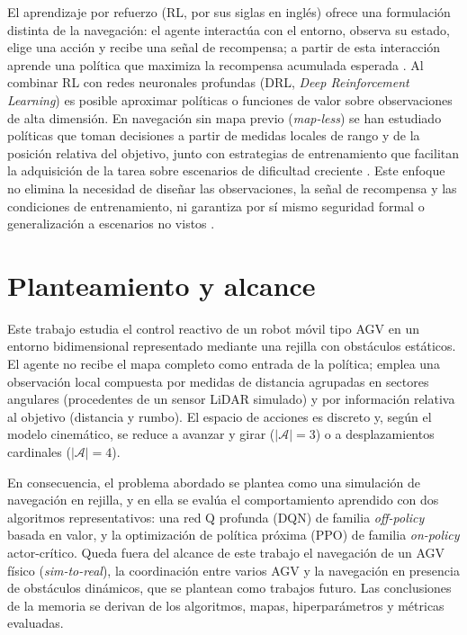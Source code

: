 El aprendizaje por refuerzo (RL, por sus siglas en inglés) ofrece una
formulación distinta de la navegación: el agente interactúa con el entorno,
observa su estado, elige una acción y recibe una señal de recompensa; a
partir de esta interacción aprende una política que maximiza la recompensa
acumulada esperada \citep{shakya2023reinforcement,murphy2025reinforcement}.
Al combinar RL con redes neuronales profundas (DRL, \textit{Deep
Reinforcement Learning}) es posible aproximar políticas o funciones de valor
sobre observaciones de alta dimensión. En navegación sin mapa previo
(\textit{map-less}) se han estudiado políticas que toman decisiones a partir
de medidas locales de rango y de la posición relativa del objetivo,
junto con estrategias de entrenamiento que facilitan la adquisición de la
tarea sobre escenarios de dificultad creciente \citep{sivashangaran2023deep,xue2022using,guo2025map}.
Este enfoque no elimina la necesidad de diseñar las observaciones, la señal
de recompensa y las condiciones de entrenamiento, ni garantiza por sí mismo
seguridad formal o generalización a escenarios no vistos
\citep{gao2025hierarchical}.

\section{Planteamiento y alcance}\label{sec:planteamiento}
Este trabajo estudia el control reactivo de un robot móvil tipo AGV en un
entorno bidimensional representado mediante una rejilla con obstáculos
estáticos. El agente no recibe el mapa completo como entrada de la política;
emplea una observación local compuesta por medidas de distancia agrupadas en
sectores angulares (procedentes de un sensor LiDAR simulado) y por
información relativa al objetivo (distancia y rumbo). El espacio de acciones
es discreto y, según el modelo cinemático, se reduce a avanzar y girar
($|\mathcal{A}| = 3$) o a desplazamientos cardinales ($|\mathcal{A}| = 4$).

En consecuencia, el problema abordado se plantea como una simulación de
navegación en rejilla, y en ella se evalúa el comportamiento aprendido con
dos algoritmos representativos: una red Q profunda (DQN) de familia
\textit{off-policy} basada en valor, y la optimización de política próxima
(PPO) de familia \textit{on-policy} actor-crítico. Queda fuera del alcance de este trabajo el navegación de un AGV físico (\textit{sim-to-real}),
la coordinación entre varios AGV y la navegación en presencia de
obstáculos dinámicos, que se plantean como trabajos futuro. Las conclusiones de la memoria se derivan de los
algoritmos, mapas, hiperparámetros y métricas evaluadas.

